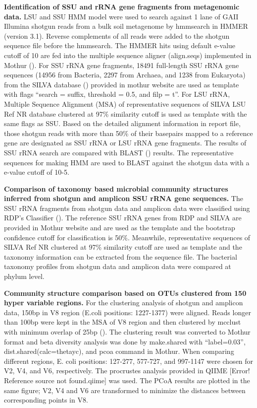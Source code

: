 \documentclass[12pt]{article}
\begin{document}
  {\bf Identification of SSU and rRNA gene fragments from metagenomic data. }
LSU and SSU HMM model were used to search against 1 lane of GAII Illumina shotgun reads from a bulk soil metagenome by hmmsearch in HMMER (version 3.1). Reverse complements of all reads were added to the shotgun sequence file before the hmmsearch. The HMMER hits using default e-value cutoff of 10 are fed into the multiple sequence aligner (align.seqs) implemented in Mothur (\cite{mothuraligner2009}). For SSU rRNA gene fragments, 18491 full-length SSU rRNA gene sequences (14956 from Bacteria, 2297 from Archaea, and 1238 from Eukaryota) from the SILVA database (\cite{silva2013}) provided in mothur website are used as template with flags ``search = suffix, threshold = 0.5, and filp = t''.  For LSU rRNA, Multiple Sequence Alignment (MSA) of representative sequences of SILVA LSU Ref NR database clustered at 97\% similarity cutoff is used as template with the same flags as SSU. Based on the detailed alignment information in report file, those shotgun reads with more than 50\% of their basepairs mapped to a reference gene are designated as SSU rRNA or LSU rRNA gene fragments. The results of SSU rRNA search are compared with BLAST (\cite{blast}) results. The representative sequences for making HMM are used to BLAST against the shotgun data with a e-value cutoff of 10-5.

  {\bf Comparison of taxonomy based microbial community structures inferred from shotgun and amplicon SSU rRNA gene sequences. }
The SSU rRNA fragments from shotgun data and amplicon data were classified using RDP’s Classifier (\cite{rdpclassifier}). The reference SSU rRNA genes from RDP and SILVA are provided in Mothur website and are used as the template and the bootstrap confidence cutoff for classification is 50\%. Meanwhile, representative sequences of SILVA Ref NR clustered at 97\% similarity cutoff are used as template and the taxonomy information can be extracted from the sequence file. The bacterial taxonomy profiles from shotgun data and amplicon data were compared at phylum level.

  {\bf Community structure comparison based on OTUs clustered from 150 hyper variable regions. }
  For the clustering analysis of shotgun and amplicon data, 150bp in V8 region (E.coli positions: 1227-1377) were aligned. Reads longer than 100bp were kept in the MSA of V8 region and then clustered by mcclust with minimum overlap of 25bp (\cite{rdp2009}). The clustering result was converted to Mothur format and beta diversity analysis was done by make.shared with ``label=0.03'', dist.shared(calc=thetayc), and pcoa command in Mothur. When comparing different regions, E. coli positions: 127-277, 577-727, and 997-1147 were chosen for V2, V4, and V6, respectively. The procrustes analysis provided in QIIME [Error! Reference source not found.qiime] was used. The PCoA results are plotted in the same figure; V2, V4 and V6 are transformed to minimize the distances between corresponding points in V8.
\end{document}
